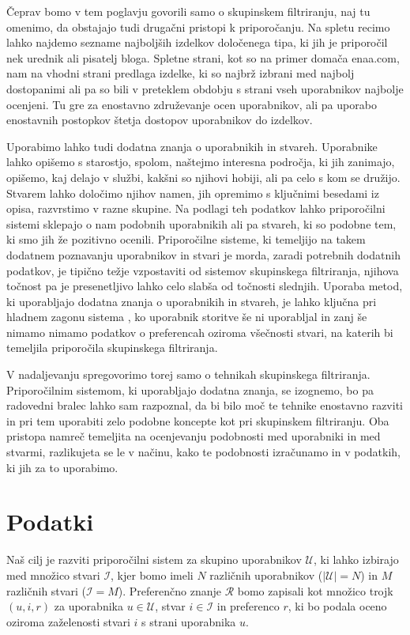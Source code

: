 Čeprav bomo v tem poglavju govorili samo o skupinskem filtriranju, naj
tu omenimo, da obstajajo tudi drugačni pristopi k priporočanju. Na
spletu recimo lahko najdemo sezname najboljših izdelkov določenega
tipa, ki jih je priporočil nek urednik ali pisatelj bloga. Spletne
strani, kot so na primer domača enaa.com, nam na vhodni strani
predlaga izdelke, ki so najbrž izbrani med najbolj dostopanimi ali pa
so bili v preteklem obdobju s strani vseh uporabnikov najbolje
ocenjeni. Tu gre za enostavno združevanje ocen uporabnikov, ali pa
uporabo enostavnih postopkov štetja dostopov uporabnikov do izdelkov.

Uporabimo lahko tudi dodatna znanja o uporabnikih in stvareh. Uporabnike lahko opišemo s starostjo, spolom, naštejmo interesna področja, ki jih zanimajo, opišemo, kaj delajo v službi, kakšni so njihovi hobiji, ali pa celo s kom se družijo. Stvarem lahko določimo njihov namen, jih opremimo s ključnimi besedami iz opisa, razvrstimo v razne skupine. Na podlagi teh podatkov lahko priporočilni sistemi sklepajo o nam podobnih uporabnikih ali pa stvareh, ki so podobne tem, ki smo jih že pozitivno ocenili. Priporočilne sisteme, ki temeljijo na takem dodatnem poznavanju uporabnikov in stvari  je morda, zaradi potrebnih dodatnih podatkov, je tipično težje vzpostaviti od sistemov skupinskega filtriranja, njihova točnost pa je presenetljivo lahko celo slabša od točnosti slednjih. Uporaba metod, ki uporabljajo dodatna znanja o uporabnikih in stvareh, je lahko ključna pri hladnem zagonu sistema , ko uporabnik storitve še ni uporabljal in zanj še nimamo nimamo podatkov o preferencah oziroma všečnosti stvari, na katerih bi temeljila priporočila skupinskega filtriranja.

V nadaljevanju spregovorimo torej samo o tehnikah skupinskega filtriranja. Priporočilnim sistemom, ki uporabljajo dodatna znanja, se izognemo, bo pa radovedni bralec lahko sam razpoznal, da bi bilo moč te tehnike enostavno razviti in pri tem uporabiti zelo podobne koncepte kot pri skupinskem filtriranju. Oba pristopa namreč temeljita na ocenjevanju podobnosti med uporabniki in med stvarmi, razlikujeta se le v načinu, kako te podobnosti izračunamo in v podatkih, ki jih za to uporabimo.

\section{Podatki}

Naš cilj je razviti priporočilni sistem za skupino uporabnikov $\mathcal{U}$, ki lahko izbirajo med množico stvari $\mathcal{I}$, kjer bomo imeli $N$ različnih uporabnikov ($|\mathcal{U}|=N$) in $M$ različnih stvari ($\mathcal{I}=M$). Preferenčno znanje $\mathcal{R}$ bomo zapisali kot množico trojk $(u,i,r)$ za uporabnika $u\in\mathcal{U}$, stvar $i\in\mathcal{I}$ in preferenco $r$, ki bo podala oceno oziroma zaželenosti stvari $i$ s strani uporabnika $u$.

